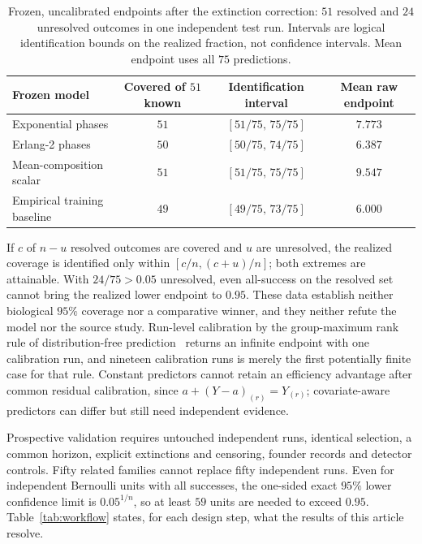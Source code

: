 \documentclass[11pt,a4paper]{article}
\theoremstyle{plain}
\theoremstyle{definition}
\theoremstyle{remark}
\begin{document}
\begin{table}[t]
\centering
\caption{Frozen, uncalibrated endpoints after the extinction correction: $51$ resolved and $24$ unresolved outcomes in one independent test run. Intervals are logical identification bounds on the realized fraction, not confidence intervals. Mean endpoint uses all $75$ predictions.}\label{tab:empirical}
\small
\begin{tabular}{@{}lccc@{}}
\toprule
Frozen model & Covered of $51$ known & Identification interval & Mean raw endpoint\\
\midrule
Exponential phases & $51$ & $[51/75,\,75/75]$ & $7.773$\\
Erlang-2 phases & $50$ & $[50/75,\,74/75]$ & $6.387$\\
Mean-composition scalar & $51$ & $[51/75,\,75/75]$ & $9.547$\\
Empirical training baseline & $49$ & $[49/75,\,73/75]$ & $6.000$\\
\bottomrule
\end{tabular}
\end{table}

If $c$ of $n-u$ resolved outcomes are covered and $u$ are unresolved, the realized coverage is identified only within $[c/n,(c+u)/n]$; both extremes are attainable. With $24/75>0.05$ unresolved, even all-success on the resolved set cannot bring the realized lower endpoint to $0.95$. These data establish neither biological $95\%$ coverage nor a comparative winner, and they neither refute the model nor the source study. Run-level calibration by the group-maximum rank rule of distribution-free prediction~\citep{vovk2005,angelopoulos2023,lee2023} returns an infinite endpoint with one calibration run, and nineteen calibration runs is merely the first potentially finite case for that rule. Constant predictors cannot retain an efficiency advantage after common residual calibration, since $a+(Y-a)_{(r)}=Y_{(r)}$; covariate-aware predictors can differ but still need independent evidence.

Prospective validation requires untouched independent runs, identical selection, a common horizon, explicit extinctions and censoring, founder records and detector controls. Fifty related families cannot replace fifty independent runs. Even for independent Bernoulli units with all successes, the one-sided exact $95\%$ lower confidence limit is $0.05^{1/n}$, so at least $59$ units are needed to exceed $0.95$. Table~\ref{tab:workflow} states, for each design step, what the results of this article resolve.
\end{document}
